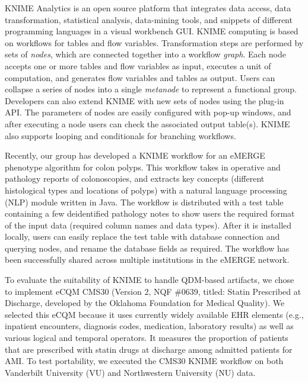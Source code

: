 \documentclass{article}
\begin{document}
KNIME Analytics is an open source platform that integrates data access, data transformation, statistical analysis, data-mining tools, and snippets of different programming languages in a visual workbench GUI. KNIME computing is based on workflows for tables and flow variables. Transformation steps are performed by sets of \emph{nodes}, which are connected together into a workflow \emph{graph}. Each node accepts one or more tables and flow variables as input, executes a unit of computation, and generates flow variables and tables as output. Users can collapse a series of nodes into a single \emph{metanode} to represent a functional group. Developers can also extend KNIME with new sets of nodes using the plug-in API. The parameters of nodes are easily configured with pop-up windows, and after executing a node users can check the associated output table(s). KNIME also supports looping and conditionals for branching workflows. 

Recently, our group has developed a KNIME workflow for an eMERGE phenotype algorithm for colon polyps\cite{gawron_anatomic_2014}. This workflow takes in operative and pathology reports of colonoscopies, and extracts key concepts (different histological types and locations of polyps) with a natural language processing (NLP) module written in Java. The workflow is distributed with a test table containing a few deidentified pathology notes to show users the required format of the input data (required column names and data types). After it is installed locally, users can easily replace the test table with database connection and querying nodes, and rename the database fields as required. The workflow has been successfully shared across multiple institutions in the eMERGE network.

To evaluate the suitability of KNIME to handle QDM-based artifacts, we chose to implement eCQM CMS30 (Version 2, NQF \#0639, titled: Statin Prescribed at Discharge\cite{krumholz_acc/aha_2008}, developed by the Oklahoma Foundation for Medical Quality). We selected this eCQM because it uses currently widely available EHR elements (e.g., inpatient encounters, diagnosis codes, medication, laboratory results) as well as various logical and temporal operators. It measures the proportion of patients that are prescribed with statin drugs at discharge among admitted patients for AMI. To test portability, we executed the CMS30 KNIME workflow on both Vanderbilt University (VU) and Northwestern University (NU) data.

\end{document}
